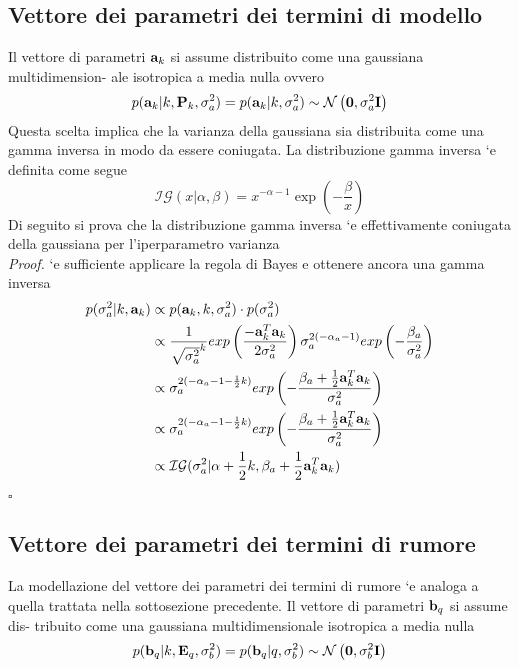 \subsection*{Vettore dei parametri dei termini di modello}
Il vettore di parametri $\textbf{a}_k$ si assume distribuito come una gaussiana multidimension-
ale isotropica a media nulla ovvero
\begin{equation}
p(\textbf{a}_k|k, \textbf{P}_k , \sigma_a^2 ) = p(\textbf{a}_k |k, \sigma_a^2 ) \sim \mathcal{N}\left(\textbf{0},\sigma_a^2\textbf{I}\right)
\end{equation}
Questa scelta implica che la varianza della gaussiana sia distribuita come una gamma
inversa in modo da essere coniugata. La distribuzione gamma inversa `e definita come
segue
\begin{equation}
\mathcal{I}\mathcal{G}(x|\alpha,\beta)= x^{-\alpha-1}\exp\left(-\frac{\beta}{x}\right)
\end{equation}
Di seguito si prova che la distribuzione gamma inversa `e effettivamente coniugata
della gaussiana per l’iperparametro varianza\\
\textit{Proof.} `e sufficiente applicare la regola di Bayes e ottenere ancora una gamma inversa
\begin{align*}
p(\sigma_a^2|k,\textbf{a}_k) & \propto p(\textbf{a}_k,k,\sigma_a^2)\cdot p(\sigma_a^2)\\
			 &\propto   \frac{1}{\sqrt{\sigma_a^2}^k}exp\left(\frac{-\textbf{a}_k^T\textbf{a}_k}{2\sigma_a^2}\right)\sigma_a^{2(-\alpha_a-1)}exp\left(-\frac{\beta_a}{\sigma_a^2}\right)\\
			 &\propto  \sigma_a^{2(-\alpha_a-1-\frac{1}{2}k)}exp\left(-\frac{\beta_a+\frac{1}{2}\textbf{a}_k^T\textbf{a}_k}{\sigma_a^2}\right) \\ 
			 &\propto   \sigma_a^{2(-\alpha_a-1-\frac{1}{2}k)}exp\left(-\frac{\beta_a+\frac{1}{2}\textbf{a}_k^T\textbf{a}_k}{\sigma_a^2}\right) \\
			 &\propto \mathcal{I}\mathcal{G}(\sigma_a^2|\alpha+\frac{1}{2}k,\beta_a+\frac{1}{2}\textbf{a}_k^T\textbf{a}_k)	
\end{align*}
 \begin{flushright}
 $\square$
 \end{flushright}

 \subsection*{Vettore dei parametri dei termini di rumore}
 La modellazione del vettore dei parametri dei termini di rumore `e analoga a quella
trattata nella sottosezione precedente. Il vettore di parametri $\textbf{b}_q$ si assume dis-
tribuito come una gaussiana multidimensionale isotropica a media nulla
\begin{equation}
p(\textbf{b}_q |k, \textbf{E}_q , \sigma_b^2 ) = p(\textbf{b}_q |q, \sigma_b^2 ) \sim \mathcal{N}\left(\textbf{0},\sigma_b^2\textbf{I}\right)
\end{equation}

